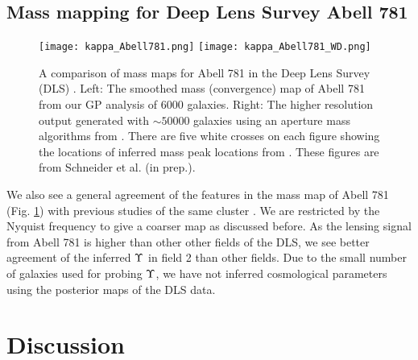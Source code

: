 \subsection{Mass mapping for Deep Lens Survey Abell 781}
\begin{figure}[h!]
	\centering
	\texttt{[image: kappa\_Abell781.png]}
	\texttt{[image: kappa\_Abell781\_WD.png]}
	\caption{A comparison of mass maps for Abell 781 in the Deep Lens Survey (DLS) 
		\label{fig:Abell781_massmap}.  Left: The smoothed mass (convergence) map of Abell 781 from 
		our GP analysis of 6000 galaxies.
		Right: The higher resolution output generated with $\sim 50000$ galaxies using an aperture
		mass algorithms from \cite{Wittman2014}. 
		There are five white crosses on each figure showing the locations of inferred mass
		peak locations from \cite{Sehgal2008}. 
	These figures are from Schneider et al. (in prep.).
}
\end{figure}
We also see a general agreement of the features in the mass map of Abell 781
(Fig. \ref{fig:Abell781_massmap}) with previous studies of the same cluster 
\cite{Wittman2014}.  
We are restricted by the Nyquist frequency to give a coarser map as discussed
before.   
As the lensing signal from Abell 781 is higher than other other fields of the
DLS, we see better agreement of the inferred $\Upsilon$ in field 2 than
other fields. 
Due to the small number of galaxies used for probing $\Upsilon$, we
 have not inferred cosmological parameters using the
posterior maps of the DLS data.



\section{Discussion}

